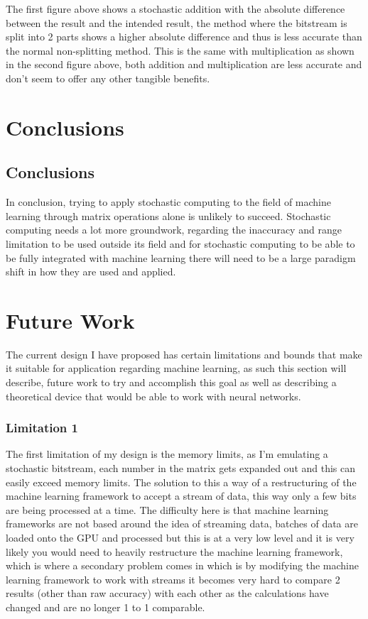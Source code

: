\documentclass[a4paper,oneside,phd,etd]{BYUPhys}
\begin{document}
The first figure above shows a stochastic addition with the absolute difference between the result and the intended result, the method where the bitstream is split into 2 parts shows a higher absolute difference and thus is less accurate than the normal non-splitting method. This is the same with multiplication as shown in the second figure above, both addition and multiplication are less accurate and don't seem to offer any other tangible benefits.

\chapter{Conclusions}
\label{chap:Conclusions}

\section{Conclusions}
\label{sec:ConclusionsConclusions}
In conclusion, trying to apply stochastic computing to the field of machine learning through matrix operations alone is unlikely to succeed. Stochastic computing needs a lot more groundwork, regarding the inaccuracy and range limitation to be used outside its field and for stochastic computing to be able to be fully integrated with machine learning there will need to be a large paradigm shift in how they are used and applied. %

\chapter{Future Work}
The current design I have proposed has certain limitations and bounds that make it suitable for application regarding machine learning, as such this section will describe, future work to try and accomplish this goal as well as describing a theoretical device that would be able to work with neural networks.

\subsection{Limitation 1}
The first limitation of my design is the memory limits, as I'm emulating a stochastic bitstream, each number in the matrix gets expanded out and this can easily exceed memory limits. The solution to this a way of a restructuring of the machine learning framework to accept a stream of data, this way only a few bits are being processed at a time. The difficulty here is that machine learning frameworks are not based around the idea of streaming data, batches of data are loaded onto the GPU and processed but this is at a very low level and it is very likely you would need to heavily restructure the machine learning framework, which is where a secondary problem comes in which is by modifying the machine learning framework to work with streams it becomes very hard to compare 2 results (other than raw accuracy) with each other as the calculations have changed and are no longer 1 to 1 comparable.
\end{document}
